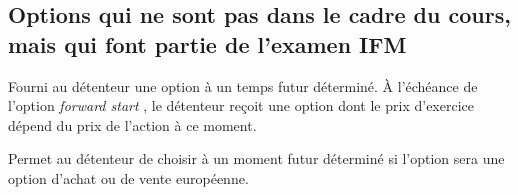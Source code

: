 \documentclass[10pt, french]{article}
\begin{document}
\begin{multicols*}{2}
\columnbreak
\subsection*{Options qui ne sont pas dans le cadre du cours, mais qui font partie de l'examen IFM}
\begin{definitionNOHFILLsub}
Fourni au détenteur une option à un temps futur déterminé. À l'échéance de l'option \og \textit{forward start} \fg{}, le détenteur reçoit une option dont le prix d'exercice dépend du prix de l'action à ce moment.	
\end{definitionNOHFILLsub}

\begin{definitionNOHFILLsub}
Permet au détenteur de choisir à un moment futur déterminé si l'option sera une option d'achat ou de vente européenne.
\end{definitionNOHFILLsub}

\end{multicols*}

\end{document}
